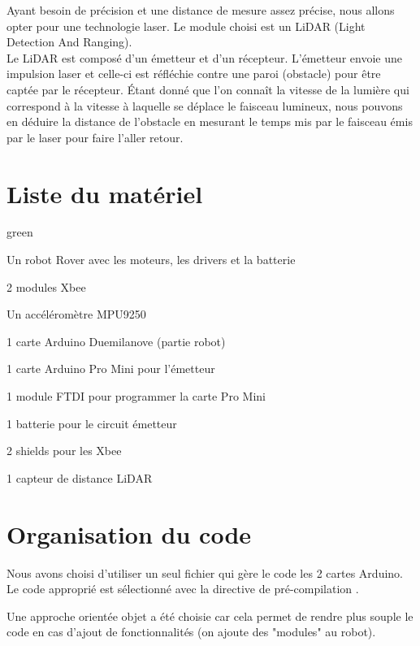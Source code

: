 {Ayant besoin de précision et une distance de mesure assez précise, nous allons opter pour une technologie laser.
Le module choisi est un LiDAR (Light Detection And Ranging).\\

Le LiDAR est composé d'un émetteur et d'un récepteur. L'émetteur envoie une impulsion laser et celle-ci est réfléchie contre une paroi (obstacle) pour être captée par le récepteur. Étant donné que l'on connaît la vitesse de la lumière qui correspond à la vitesse à laquelle se déplace le faisceau lumineux, nous pouvons en déduire la distance de l'obstacle en mesurant le temps mis par le faisceau émis par le laser pour faire l'aller retour. 



\section{Liste du matériel}

\begin{items}{green}{\faLeaf}
    \item Un robot Rover avec les moteurs, les drivers et la batterie
    
     
    \item 2 modules Xbee
    \item Un accéléromètre MPU9250
    \item 1 carte Arduino Duemilanove (partie robot)
    \item 1 carte Arduino Pro Mini pour l'émetteur
    \item 1 module FTDI pour programmer la carte Pro Mini
    \item 1 batterie pour le circuit émetteur 
    \item 2 shields pour les Xbee
    \item 1 capteur de distance LiDAR
\end{items}

\section{Organisation du code}

Nous avons choisi d'utiliser un seul fichier qui gère le code les 2 cartes Arduino. Le code approprié est sélectionné avec la directive de pré-compilation .

Une approche orientée objet a été choisie car cela permet de rendre plus souple le code en cas d'ajout de fonctionnalités (on ajoute des "modules" au robot).\\

}
